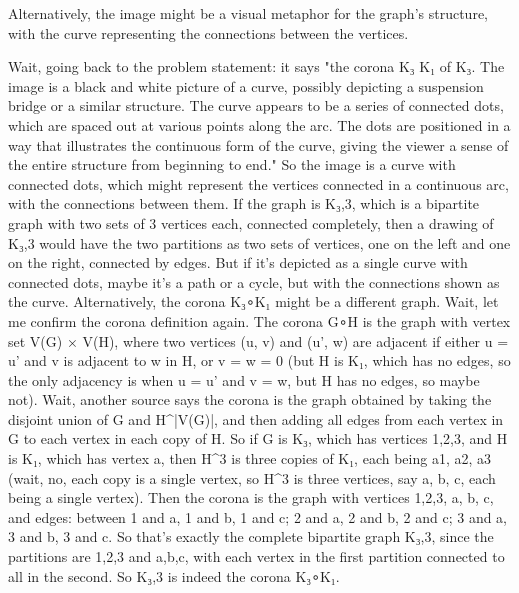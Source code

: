 Alternatively, the image might be a visual metaphor for the graph's structure, with the curve representing the connections between the vertices. 

Wait, going back to the problem statement: it says "the corona K₃ K₁ of K₃. The image is a black and white picture of a curve, possibly depicting a suspension bridge or a similar structure. The curve appears to be a series of connected dots, which are spaced out at various points along the arc. The dots are positioned in a way that illustrates the continuous form of the curve, giving the viewer a sense of the entire structure from beginning to end." So the image is a curve with connected dots, which might represent the vertices connected in a continuous arc, with the connections between them. If the graph is K₃,3, which is a bipartite graph with two sets of 3 vertices each, connected completely, then a drawing of K₃,3 would have the two partitions as two sets of vertices, one on the left and one on the right, connected by edges. But if it's depicted as a single curve with connected dots, maybe it's a path or a cycle, but with the connections shown as the curve. Alternatively, the corona K₃∘K₁ might be a different graph. Wait, let me confirm the corona definition again. The corona G∘H is the graph with vertex set V(G) × V(H), where two vertices (u, v) and (u', w) are adjacent if either u = u' and v is adjacent to w in H, or v = w = 0 (but H is K₁, which has no edges, so the only adjacency is when u = u' and v = w, but H has no edges, so maybe not). Wait, another source says the corona is the graph obtained by taking the disjoint union of G and H^|V(G)|, and then adding all edges from each vertex in G to each vertex in each copy of H. So if G is K₃, which has vertices {1,2,3}, and H is K₁, which has vertex {a}, then H^3 is three copies of K₁, each being {a1, a2, a3} (wait, no, each copy is a single vertex, so H^3 is three vertices, say a, b, c, each being a single vertex). Then the corona is the graph with vertices {1,2,3, a, b, c}, and edges: between 1 and a, 1 and b, 1 and c; 2 and a, 2 and b, 2 and c; 3 and a, 3 and b, 3 and c. So that's exactly the complete bipartite graph K₃,3, since the partitions are {1,2,3} and {a,b,c}, with each vertex in the first partition connected to all in the second. So K₃,3 is indeed the corona K₃∘K₁. 

